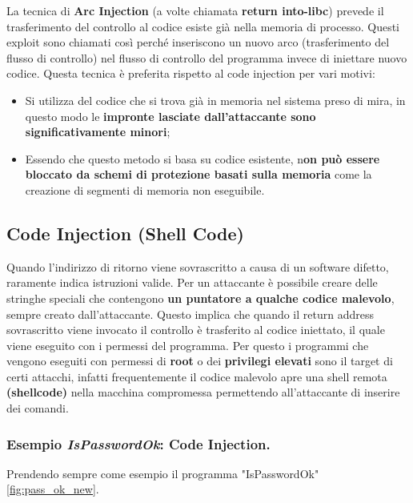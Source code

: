 La tecnica di \textbf{Arc Injection} (a volte chiamata \textbf{return into-libc}) prevede
il trasferimento del controllo al codice esiste già nella memoria di processo.
Questi exploit sono chiamati così perché inseriscono un nuovo arco
(trasferimento del flusso di controllo) nel flusso di controllo del programma invece
di iniettare nuovo codice. Questa tecnica è preferita rispetto al code injection
per vari motivi:

\begin{itemize}
    \item Si utilizza del codice che si trova già in memoria nel sistema preso di mira,
          in questo modo le \textbf{impronte lasciate dall'attaccante sono significativamente minori};
    \item Essendo che questo metodo si basa su codice
          esistente, n\textbf{on può essere bloccato da schemi di protezione basati sulla memoria}
          come la creazione di segmenti di memoria non eseguibile.
\end{itemize}

\subsection{Code Injection (Shell Code)}

Quando l'indirizzo di ritorno viene sovrascritto a causa di un software difetto,
raramente indica istruzioni valide. Per un attaccante è possibile creare delle
stringhe speciali che contengono \textbf{un puntatore a qualche codice malevolo},
sempre creato dall'attaccante. Questo implica che quando il return address sovrascritto
viene invocato il controllo è trasferito al codice iniettato, il quale viene
eseguito con i permessi del programma. Per questo i programmi che vengono eseguiti
con permessi di \textbf{root} o dei \textbf{privilegi elevati} sono il target di
certi attacchi, infatti frequentemente il codice malevolo apre una shell remota
\textbf{(shellcode)} nella macchina compromessa permettendo all'attaccante di inserire
dei comandi.

\subsubsection{Esempio \textit{IsPasswordOk}: Code Injection.}

Prendendo sempre come esempio il programma "IsPasswordOk" \ref{fig:pass_ok_new}.

